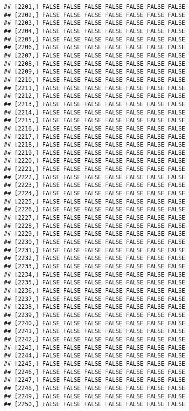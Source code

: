 \documentclass[
]{article}
\begin{document}
\begin{verbatim}
## [2201,] FALSE FALSE FALSE FALSE FALSE FALSE FALSE
## [2202,] FALSE FALSE FALSE FALSE FALSE FALSE FALSE
## [2203,] FALSE FALSE FALSE FALSE FALSE FALSE FALSE
## [2204,] FALSE FALSE FALSE FALSE FALSE FALSE FALSE
## [2205,] FALSE FALSE FALSE FALSE FALSE FALSE FALSE
## [2206,] FALSE FALSE FALSE FALSE FALSE FALSE FALSE
## [2207,] FALSE FALSE FALSE FALSE FALSE FALSE FALSE
## [2208,] FALSE FALSE FALSE FALSE FALSE FALSE FALSE
## [2209,] FALSE FALSE FALSE FALSE FALSE FALSE FALSE
## [2210,] FALSE FALSE FALSE FALSE FALSE FALSE FALSE
## [2211,] FALSE FALSE FALSE FALSE FALSE FALSE FALSE
## [2212,] FALSE FALSE FALSE FALSE FALSE FALSE FALSE
## [2213,] FALSE FALSE FALSE FALSE FALSE FALSE FALSE
## [2214,] FALSE FALSE FALSE FALSE FALSE FALSE FALSE
## [2215,] FALSE FALSE FALSE FALSE FALSE FALSE FALSE
## [2216,] FALSE FALSE FALSE FALSE FALSE FALSE FALSE
## [2217,] FALSE FALSE FALSE FALSE FALSE FALSE FALSE
## [2218,] FALSE FALSE FALSE FALSE FALSE FALSE FALSE
## [2219,] FALSE FALSE FALSE FALSE FALSE FALSE FALSE
## [2220,] FALSE FALSE FALSE FALSE FALSE FALSE FALSE
## [2221,] FALSE FALSE FALSE FALSE FALSE FALSE FALSE
## [2222,] FALSE FALSE FALSE FALSE FALSE FALSE FALSE
## [2223,] FALSE FALSE FALSE FALSE FALSE FALSE FALSE
## [2224,] FALSE FALSE FALSE FALSE FALSE FALSE FALSE
## [2225,] FALSE FALSE FALSE FALSE FALSE FALSE FALSE
## [2226,] FALSE FALSE FALSE FALSE FALSE FALSE FALSE
## [2227,] FALSE FALSE FALSE FALSE FALSE FALSE FALSE
## [2228,] FALSE FALSE FALSE FALSE FALSE FALSE FALSE
## [2229,] FALSE FALSE FALSE FALSE FALSE FALSE FALSE
## [2230,] FALSE FALSE FALSE FALSE FALSE FALSE FALSE
## [2231,] FALSE FALSE FALSE FALSE FALSE FALSE FALSE
## [2232,] FALSE FALSE FALSE FALSE FALSE FALSE FALSE
## [2233,] FALSE FALSE FALSE FALSE FALSE FALSE FALSE
## [2234,] FALSE FALSE FALSE FALSE FALSE FALSE FALSE
## [2235,] FALSE FALSE FALSE FALSE FALSE FALSE FALSE
## [2236,] FALSE FALSE FALSE FALSE FALSE FALSE FALSE
## [2237,] FALSE FALSE FALSE FALSE FALSE FALSE FALSE
## [2238,] FALSE FALSE FALSE FALSE FALSE FALSE FALSE
## [2239,] FALSE FALSE FALSE FALSE FALSE FALSE FALSE
## [2240,] FALSE FALSE FALSE FALSE FALSE FALSE FALSE
## [2241,] FALSE FALSE FALSE FALSE FALSE FALSE FALSE
## [2242,] FALSE FALSE FALSE FALSE FALSE FALSE FALSE
## [2243,] FALSE FALSE FALSE FALSE FALSE FALSE FALSE
## [2244,] FALSE FALSE FALSE FALSE FALSE FALSE FALSE
## [2245,] FALSE FALSE FALSE FALSE FALSE FALSE FALSE
## [2246,] FALSE FALSE FALSE FALSE FALSE FALSE FALSE
## [2247,] FALSE FALSE FALSE FALSE FALSE FALSE FALSE
## [2248,] FALSE FALSE FALSE FALSE FALSE FALSE FALSE
## [2249,] FALSE FALSE FALSE FALSE FALSE FALSE FALSE
## [2250,] FALSE FALSE FALSE FALSE FALSE FALSE FALSE

\end{verbatim}
\end{document}

